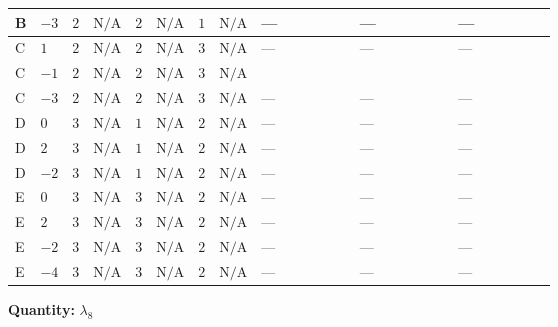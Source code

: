 \documentclass[8pt]{article}
\begin{document}
\begin{landscape}
\begin{longtable}{@{}llcccccc >{\raggedright\arraybackslash}p{0.21\linewidth} >{\raggedright\arraybackslash}p{0.21\linewidth} >{\raggedright\arraybackslash}p{0.21\linewidth}@{}}
\midrule
B & $-3$ & $2$ & $\text{N/A}$ & $2$ & $\text{N/A}$ & $1$ & $\text{N/A}$ & --- & --- & --- \\
\midrule
C & $1$ & $2$ & $\text{N/A}$ & $2$ & $\text{N/A}$ & $3$ & $\text{N/A}$ & --- & --- & --- \\
\midrule
C & $-1$ & $2$ & $\text{N/A}$ & $2$ & $\text{N/A}$ & $3$ & $\text{N/A}$ & \scriptsize\adjustbox{max width=\linewidth}{$\begin{gathered} {\lambda_{8}} (6 \operatorname{Tr}\!\left({Y_d}\,\left({Y_d}\right)^{\dagger}\right)+2 \operatorname{Tr}\!\left({Y_e}\,\left({Y_e}\right)^{\dagger}\right)+6 \operatorname{Tr}\!\left({Y_u}\,\left({Y_u}\right)^{\dagger}\right))\end{gathered}$} & \scriptsize\adjustbox{max width=\linewidth}{$\begin{gathered} +4 {\lambda_{7}} \left({\lambda_{9}}\right)^{*}\end{gathered}$} & \scriptsize\adjustbox{max width=\linewidth}{$\begin{gathered} -9 {g_2}^2 {\lambda_{8}}\end{gathered}$} \\
\midrule
C & $-3$ & $2$ & $\text{N/A}$ & $2$ & $\text{N/A}$ & $3$ & $\text{N/A}$ & --- & --- & --- \\
\midrule
D & $0$ & $3$ & $\text{N/A}$ & $1$ & $\text{N/A}$ & $2$ & $\text{N/A}$ & --- & --- & --- \\
\midrule
D & $2$ & $3$ & $\text{N/A}$ & $1$ & $\text{N/A}$ & $2$ & $\text{N/A}$ & --- & --- & --- \\
\midrule
D & $-2$ & $3$ & $\text{N/A}$ & $1$ & $\text{N/A}$ & $2$ & $\text{N/A}$ & --- & --- & --- \\
\midrule
E & $0$ & $3$ & $\text{N/A}$ & $3$ & $\text{N/A}$ & $2$ & $\text{N/A}$ & --- & --- & --- \\
\midrule
E & $2$ & $3$ & $\text{N/A}$ & $3$ & $\text{N/A}$ & $2$ & $\text{N/A}$ & --- & --- & --- \\
\midrule
E & $-2$ & $3$ & $\text{N/A}$ & $3$ & $\text{N/A}$ & $2$ & $\text{N/A}$ & --- & --- & --- \\
\midrule
E & $-4$ & $3$ & $\text{N/A}$ & $3$ & $\text{N/A}$ & $2$ & $\text{N/A}$ & --- & --- & --- \\
\midrule
\bottomrule
\end{longtable}
\clearpage
\noindent\textbf{Quantity: }$\lambda_{8}$\par\smallskip

\end{landscape}
\end{document}
